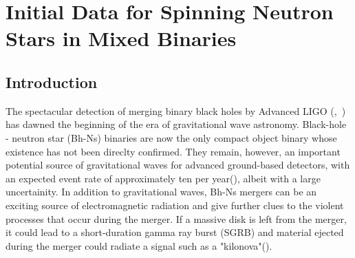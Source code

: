 

\chapter{Initial Data for Spinning Neutron Stars in Mixed Binaries}

\section{Introduction}
The spectacular detection of merging binary black holes by Advanced
LIGO (\cite{Abbott:2016blz},~\cite{PhysRevLett.116.241103}) has dawned the beginning of the era of gravitational wave astronomy. Black-hole - neutron star (Bh-Ns) binaries are now the only compact object binary whose existence has not been direclty confirmed. They remain, however, an important potential source of gravitational waves for advanced ground-based detectors, with an expected event rate of approximately ten per year(\cite{AbadieLSC:2010}), albeit with a large uncertainity. In addition to gravitational waves, Bh-Ns mergers can be an exciting source of electromagnetic radiation and give further clues to the violent processes that occur during the merger. If a massive disk is left from the merger, it could lead to a short-duration gamma ray burst (SGRB) and material ejected during the merger could radiate a signal such as a "kilonova"(\cite{metzger:11}).

